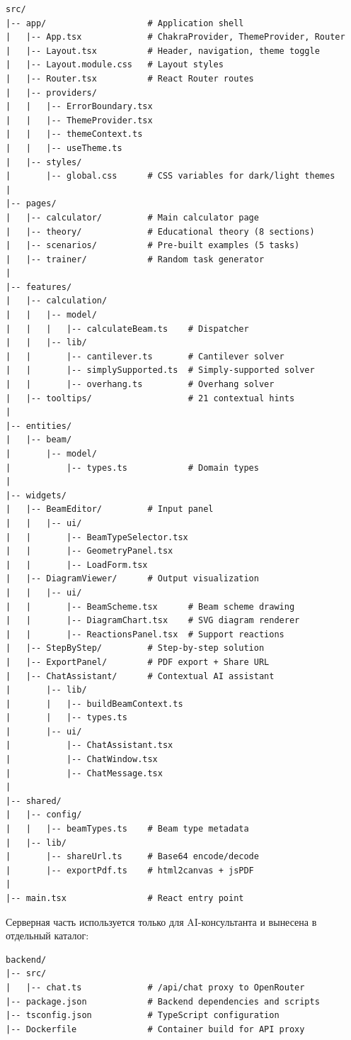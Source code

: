 \begin{lstlisting}[basicstyle=\small\ttfamily, frame=none, numbers=none]
src/
|-- app/                    # Application shell
|   |-- App.tsx             # ChakraProvider, ThemeProvider, Router
|   |-- Layout.tsx          # Header, navigation, theme toggle
|   |-- Layout.module.css   # Layout styles
|   |-- Router.tsx          # React Router routes
|   |-- providers/
|   |   |-- ErrorBoundary.tsx
|   |   |-- ThemeProvider.tsx
|   |   |-- themeContext.ts
|   |   |-- useTheme.ts
|   |-- styles/
|       |-- global.css      # CSS variables for dark/light themes
|
|-- pages/
|   |-- calculator/         # Main calculator page
|   |-- theory/             # Educational theory (8 sections)
|   |-- scenarios/          # Pre-built examples (5 tasks)
|   |-- trainer/            # Random task generator
|
|-- features/
|   |-- calculation/
|   |   |-- model/
|   |   |   |-- calculateBeam.ts    # Dispatcher
|   |   |-- lib/
|   |       |-- cantilever.ts       # Cantilever solver
|   |       |-- simplySupported.ts  # Simply-supported solver
|   |       |-- overhang.ts         # Overhang solver
|   |-- tooltips/                   # 21 contextual hints
|
|-- entities/
|   |-- beam/
|       |-- model/
|           |-- types.ts            # Domain types
|
|-- widgets/
|   |-- BeamEditor/         # Input panel
|   |   |-- ui/
|   |       |-- BeamTypeSelector.tsx
|   |       |-- GeometryPanel.tsx
|   |       |-- LoadForm.tsx
|   |-- DiagramViewer/      # Output visualization
|   |   |-- ui/
|   |       |-- BeamScheme.tsx      # Beam scheme drawing
|   |       |-- DiagramChart.tsx    # SVG diagram renderer
|   |       |-- ReactionsPanel.tsx  # Support reactions
|   |-- StepByStep/         # Step-by-step solution
|   |-- ExportPanel/        # PDF export + Share URL
|   |-- ChatAssistant/      # Contextual AI assistant
|       |-- lib/
|       |   |-- buildBeamContext.ts
|       |   |-- types.ts
|       |-- ui/
|           |-- ChatAssistant.tsx
|           |-- ChatWindow.tsx
|           |-- ChatMessage.tsx
|
|-- shared/
|   |-- config/
|   |   |-- beamTypes.ts    # Beam type metadata
|   |-- lib/
|       |-- shareUrl.ts     # Base64 encode/decode
|       |-- exportPdf.ts    # html2canvas + jsPDF
|
|-- main.tsx                # React entry point
\end{lstlisting}

\vspace{1em}

Серверная часть используется только для AI-консультанта и вынесена в отдельный каталог:

\begin{lstlisting}[basicstyle=\small\ttfamily, frame=none, numbers=none]
backend/
|-- src/
|   |-- chat.ts             # /api/chat proxy to OpenRouter
|-- package.json            # Backend dependencies and scripts
|-- tsconfig.json           # TypeScript configuration
|-- Dockerfile              # Container build for API proxy
\end{lstlisting}
